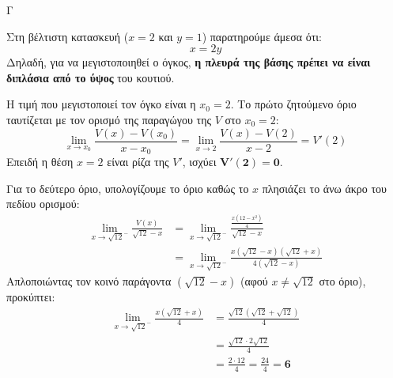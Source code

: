 \begin{thema}{Γ}
\begin{erwthma}
\item Στη βέλτιστη κατασκευή ($x=2$ και $y=1$) παρατηρούμε άμεσα ότι:
\[ x = 2y \]
Δηλαδή, για να μεγιστοποιηθεί ο όγκος, \textbf{η πλευρά της βάσης πρέπει να είναι διπλάσια από το ύψος} του κουτιού.

\item Η τιμή που μεγιστοποιεί τον όγκο είναι η $x_0 = 2$.
Το πρώτο ζητούμενο όριο ταυτίζεται με τον ορισμό της παραγώγου της $V$ στο $x_0 = 2$:
\[ \lim_{x \to x_0} \frac{V(x) - V(x_0)}{x-x_0} = \lim_{x \to 2} \frac{V(x) - V(2)}{x-2} = V'(2) \]
Επειδή η θέση $x=2$ είναι ρίζα της $V'$, ισχύει $\boldsymbol{V'(2) = 0}$.

Για το δεύτερο όριο, υπολογίζουμε το όριο καθώς το $x$ πλησιάζει το άνω άκρο του πεδίου ορισμού:
\begin{align*}
\lim_{x \to \sqrt{12}^-} \frac{V(x)}{\sqrt{12}-x} &= \lim_{x \to \sqrt{12}^-} \frac{\frac{x(12-x^2)}{4}}{\sqrt{12}-x} \\
&= \lim_{x \to \sqrt{12}^-} \frac{x(\sqrt{12}-x)(\sqrt{12}+x)}{4(\sqrt{12}-x)}
\end{align*}
Απλοποιώντας τον κοινό παράγοντα $(\sqrt{12}-x)$ (αφού $x \neq \sqrt{12}$ στο όριο), προκύπτει:
\begin{align*}
\lim_{x \to \sqrt{12}^-} \frac{x(\sqrt{12}+x)}{4} &= \frac{\sqrt{12}(\sqrt{12}+\sqrt{12})}{4} \\
&= \frac{\sqrt{12} \cdot 2\sqrt{12}}{4} \\
&= \frac{2 \cdot 12}{4} = \frac{24}{4} = \boldsymbol{6}
\end{align*}
\end{erwthma}
\end{thema}

